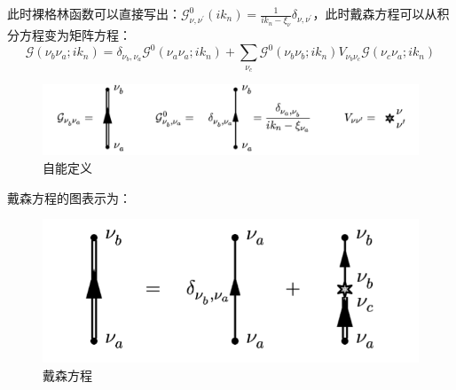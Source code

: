 \documentclass[10pt,openany]{book}
\theoremstyle{thmstyle} %
\theoremstyle{defstyle} %
\theoremstyle{prostyle} %
\begin{document}
此时裸格林函数可以直接写出：$ \mathcal{G}_{\nu, \nu^{\prime}}^0\left(i k_n\right)=\frac{1}{i k_n-\xi_\nu} \delta_{\nu, \nu^{\prime}} $，此时戴森方程可以从积分方程变为矩阵方程：
\begin{equation}
  \mathcal{G}\left(\nu_b \nu_a ; i k_n\right)=\delta_{\nu_b, \nu_a} \mathcal{G}^0\left(\nu_a \nu_a ; i k_n\right)+\sum_{\nu_c} \mathcal{G}^0\left(\nu_b \nu_b ; i k_n\right) V_{\nu_b \nu_c} \mathcal{G}\left(\nu_c \nu_a ; i k_n\right)
\end{equation} 
\begin{figure}[htp]
  \centering
  \includegraphics[scale=0.7]{Figures/biaoji.png}
  \caption{自能定义}
\end{figure}
戴森方程的图表示为：
\begin{figure}[htbp]
  \centering
  \includegraphics*[scale=0.7]{Figures/DaysonEq.png}
  \caption{戴森方程}
\end{figure}
\end{document}
